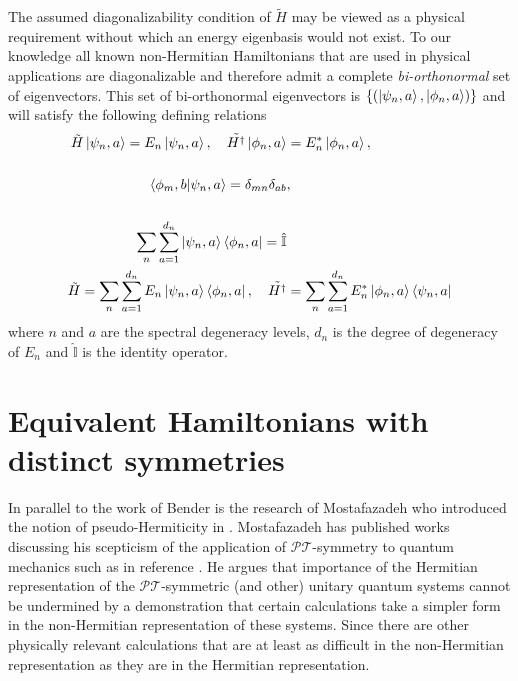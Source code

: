 \documentclass[12pt, a4paper]{report}
\newcommand\PT{\(\mathcal{PT}\)}
\begin{document}
The assumed diagonalizability condition of $\tilde{H}$ may be viewed as a physical requirement without which an energy eigenbasis would not exist. To our knowledge all known non-Hermitian Hamiltonians that are used in physical applications are diagonalizable and therefore admit a complete \emph{bi-orthonormal} set of eigenvectors. This set of bi-orthonormal eigenvectors is $\{(\ket{\psi_{n}, a}, \ket{\phi_{n}, a})\}$ and will satisfy the following defining relations\cite{Pseudo-HermiticityIII}
\begin{align}
\tilde{H}\ket{\psi_{n}, a} = E_{n}\ket{\psi_{n}, a},\quad\tilde{H^{\dagger}}\ket{\phi_{n}, a} &= E^{*}_{n}\ket{\phi_{n}, a},\\
\nonumber\\
\braket{\phi_{m}, b|\psi_{n}, a} = \delta_{mn}\delta_{ab}&,\\
\nonumber\\
\sum^{}_{n}\sum_{a=1}^{d_n}\ket{\psi_{n}, a}\bra{\phi_{n}, a} = \hat{\mathbb{I}}&\\
\tilde{H} = \sum^{}_{n}\sum_{a=1}^{d_n}E_{n}\ket{\psi_{n}, a}\bra{\phi_{n}, a},\quad\tilde{H^{\dagger}} &= \sum^{}_{n}\sum_{a=1}^{d_n}E_{n}^{*}\ket{\phi_{n}, a}\bra{\psi_{n}, a}
\end{align}
where $n$ and $a$ are the spectral degeneracy levels, $d_n$ is the degree of degeneracy of $E_n$ and $\hat{\mathbb{I}}$ is the identity operator\cite{Pseudo-HermiticityIII}.

\section{Equivalent Hamiltonians with distinct symmetries}\label{EqHH}
In parallel to the work of Bender is the research of Mostafazadeh who introduced the notion of pseudo-Hermiticity in \cite{Mostafazadeh, Pseudo-HermiticityII, Pseudo-HermiticityIII, Mostafazadeh2, Mostafazadeh_2002}. Mostafazadeh has published works discussing his scepticism of the application of \PT-symmetry to quantum mechanics such as in reference \cite{Critique}. He argues that importance of the Hermitian representation of the \PT-symmetric (and other) unitary quantum systems cannot be undermined by a demonstration that certain calculations take a simpler form in the non-Hermitian representation of these systems. Since there are other physically relevant calculations that are at least as difficult in the non-Hermitian representation as they are in the Hermitian representation\cite{Mostafazadeh_comment}.
\end{document}
